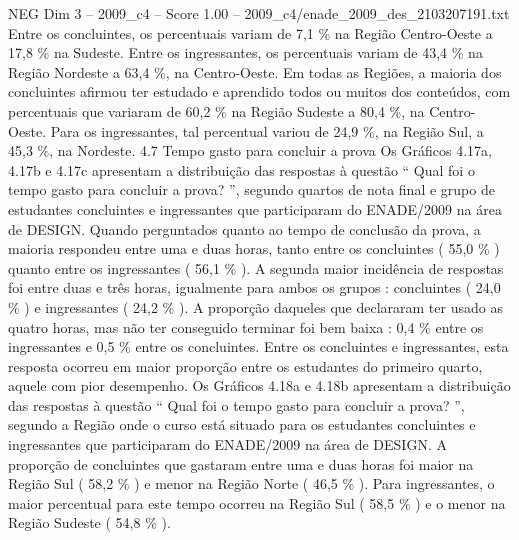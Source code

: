 \begin{textsample}{NEG Dim 3 – 2009\_c4 – Score 1.00 – 2009\_c4/enade\_2009\_des\_2103207191.txt}
Entre os concluintes, os percentuais variam de 7,1 \% na Região Centro-Oeste a 17,8 \% na Sudeste.
Entre os ingressantes, os percentuais variam de 43,4 \% na Região Nordeste a 63,4 \%, na Centro-Oeste.
Em todas as Regiões, a maioria dos concluintes afirmou ter estudado e aprendido todos ou muitos dos conteúdos, com percentuais que variaram de 60,2 \% na Região Sudeste a 80,4 \%, na Centro-Oeste.
Para os ingressantes, tal percentual variou de 24,9 \%, na Região Sul, a 45,3 \%, na Nordeste. 4.7 Tempo gasto para concluir a prova Os Gráficos 4.17a, 4.17b e 4.17c apresentam a distribuição das respostas à questão “ Qual foi o tempo gasto para concluir a prova? ”, segundo quartos de nota final e grupo de estudantes concluintes e ingressantes que participaram do ENADE/2009 na área de DESIGN.
Quando perguntados quanto ao tempo de conclusão da prova, a maioria respondeu entre uma e duas horas, tanto entre os concluintes ( 55,0 \% ) quanto entre os ingressantes ( 56,1 \% ).
A segunda maior incidência de respostas foi entre duas e três horas, igualmente para ambos os grupos : concluintes ( 24,0 \% ) e ingressantes ( 24,2 \% ).
A proporção daqueles que declararam ter usado as quatro horas, mas não ter conseguido terminar foi bem baixa : 0,4 \% entre os ingressantes e 0,5 \% entre os concluintes.
Entre os concluintes e ingressantes, esta resposta ocorreu em maior proporção entre os estudantes do primeiro quarto, aquele com pior desempenho.
Os Gráficos 4.18a e 4.18b apresentam a distribuição das respostas à questão “ Qual foi o tempo gasto para concluir a prova? ”, segundo a Região onde o curso está situado para os estudantes concluintes e ingressantes que participaram do ENADE/2009 na área de DESIGN.
A proporção de concluintes que gastaram entre uma e duas horas foi maior na Região Sul ( 58,2 \% ) e menor na Região Norte ( 46,5 \% ).
Para ingressantes, o maior percentual para este tempo ocorreu na Região Sul ( 58,5 \% ) e o menor na Região Sudeste ( 54,8 \% ).

\end{textsample}
